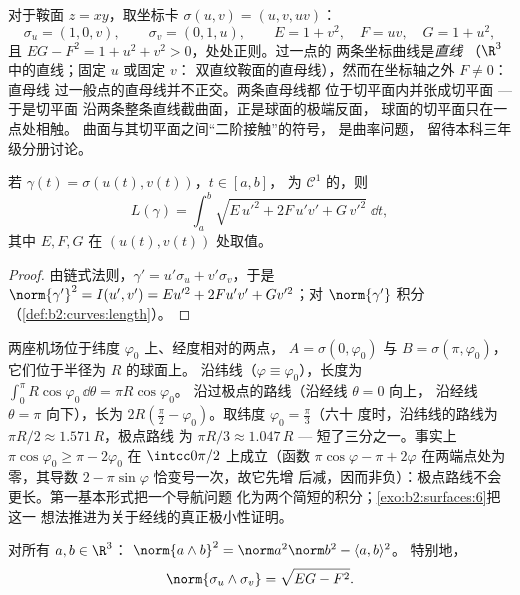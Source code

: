 \begin{example}[鞍面坐标卡]\label{ex:b2:surfaces:saddlechart}
对于鞍面 $z = xy$，取坐标卡 $\sigma(u, v) = (u, v,
uv)$：
\[
\sigma_u = (1, 0, v), \qquad \sigma_v = (0, 1, u),
\qquad
E = 1 + v^2, \quad F = uv, \quad G = 1 + u^2 ,
\]
且 $EG - F^2 = 1 + u^2 + v^2 > 0$，处处正则。过一点的
两条坐标曲线是\emph{直线
}（$\R^3$ 中的直线；固定 $u$ 或固定 $v$：
双直纹鞍面的直母线），然而在坐标轴之外 $F \neq 0$：直母线
过一般点的直母线并不正交。两条直母线都
位于切平面内并张成切平面 --- 于是切平面
沿两条整条直线截曲面，正是球面的极端反面，
球面的切平面只在一点处相触。
曲面与其切平面之间“二阶接触”的符号，
是曲率问题，
留待本科三年级分册讨论。
\end{example}

\begin{proposition}[曲面上所画曲线的
长度]\label{prop:b2:surfaces:curvelength}
若 $\gamma(t) = \sigma(u(t), v(t))$，$t \in [a, b]$，
为 $\mathcal{C}^1$ 的，则
\[
L(\gamma) = \int_a^b
\sqrt{E\,u'^2 + 2F\,u'v' + G\,v'^2}\;\dd t ,
\]
其中 $E, F, G$ 在 $(u(t), v(t))$ 处取值。
\end{proposition}

\begin{proof}
由链式法则，$\gamma' = u'\sigma_u + v'\sigma_v$，于是
$\norm{\gamma'}^2 = I(u', v') = Eu'^2 + 2Fu'v' + Gv'^2$；对
$\norm{\gamma'}$ 积分（\cref{def:b2:curves:length}）。
\end{proof}

\begin{example}[为何客机飞越极点]\label{ex:b2:surfaces:polarroute}
两座机场位于纬度 $\varphi_0$ 上、经度相对的两点，
$A = \sigma(0, \varphi_0)$ 与 $B = \sigma(\pi,
\varphi_0)$，它们位于半径为 $R$ 的球面上。
沿纬线（$\varphi \equiv \varphi_0$），长度为
$\int_0^\pi R\cos\varphi_0\,\dd\theta = \pi R\cos\varphi_0$。
沿过极点的路线（沿经线 $\theta = 0$ 向上，
沿经线 $\theta = \pi$ 向下），长为 $2R(\frac\pi2 -
\varphi_0)$。取纬度 $\varphi_0 = \frac\pi3$（六十
度时，沿纬线的路线为 $\pi R/2 \approx 1.571\,R$，极点路线
为 $\pi R/3 \approx 1.047\,R$ --- 短了三分之一。事实上
$\pi\cos\varphi_0 \geq \pi - 2\varphi_0$ 在
$\intcc0{\pi/2}$ 上成立（函数 $\pi\cos\varphi - \pi +
2\varphi$ 在两端点处为零，其导数 $2 -
\pi\sin\varphi$ 恰变号一次，故它先增
后减，因而非负）：极点路线不会
更长。第一基本形式把一个导航问题
化为两个简短的积分；\cref{exo:b2:surfaces:6}把这一
想法推进为关于经线的真正极小性证明。
\end{example}

\begin{lemma}[拉格朗日恒等式]\label{lem:b2:surfaces:lagrange}
对所有 $a, b \in \R^3$：
$\norm{a \wedge b}^2 = \norm a^2 \norm b^2 - \langle a, b\rangle^2$。
特别地，
\[
\norm{\sigma_u \wedge \sigma_v} = \sqrt{EG - F^2}.
\]
\end{lemma}

